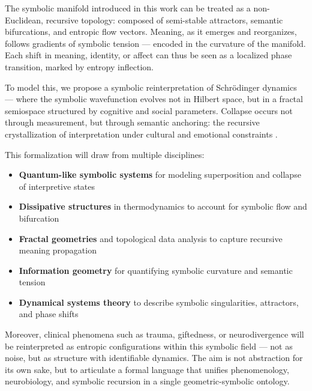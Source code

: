 The symbolic manifold introduced in this work can be treated as a non-Euclidean, recursive topology: composed of semi-stable attractors, semantic bifurcations, and entropic flow vectors. Meaning, as it emerges and reorganizes, follows gradients of symbolic tension — encoded in the curvature of the manifold. Each shift in meaning, identity, or affect can thus be seen as a localized phase transition, marked by entropy inflection.

To model this, we propose a symbolic reinterpretation of Schrödinger dynamics — where the symbolic wavefunction evolves not in Hilbert space, but in a fractal semiospace structured by cognitive and social parameters. Collapse occurs not through measurement, but through semantic anchoring: the recursive crystallization of interpretation under cultural and emotional constraints \cite{chang2015quantum, prigogine1980frombeing}.

This formalization will draw from multiple disciplines:
\begin{itemize}
  \item \textbf{Quantum-like symbolic systems} \cite{busemeyer2012quantum} for modeling superposition and collapse of interpretive states
  \item \textbf{Dissipative structures} in thermodynamics to account for symbolic flow and bifurcation
  \item \textbf{Fractal geometries} and topological data analysis to capture recursive meaning propagation
  \item \textbf{Information geometry} for quantifying symbolic curvature and semantic tension
  \item \textbf{Dynamical systems theory} to describe symbolic singularities, attractors, and phase shifts
\end{itemize}

Moreover, clinical phenomena such as trauma, giftedness, or neurodivergence will be reinterpreted as entropic configurations within this symbolic field — not as noise, but as structure with identifiable dynamics. The aim is not abstraction for its own sake, but to articulate a formal language that unifies phenomenology, neurobiology, and symbolic recursion in a single geometric-symbolic ontology.



